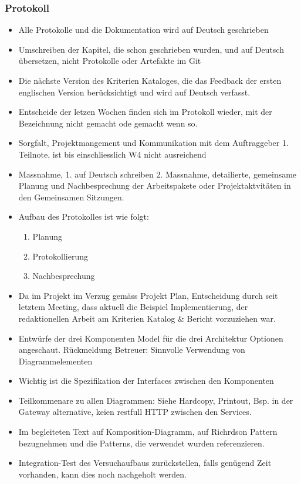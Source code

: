 \documentclass{article}
\begin{document}
\subsubsection{Protokoll}
\begin{itemize}
    \item Alle Protokolle und die Dokumentation wird auf Deutsch geschrieben
    \item Umschreiben der Kapitel, die schon geschrieben wurden, und auf Deutsch übersetzen, nicht Protokolle oder Artefakte im Git
    \item Die nächste Version des Kriterien Kataloges, die das Feedback der ersten englischen Version berücksichtigt und wird auf Deutsch verfasst.
    \item Entscheide der letzen Wochen finden sich im Protokoll wieder, mit der Bezeichnung nicht gemacht ode gemacht wenn so.
    \item Sorgfalt, Projektmangement und Kommunikation mit dem Auftraggeber 1. Teilnote, ist bis einschliesslich W4 nicht ausreichend
    \item Massnahme, 1. auf Deutsch schreiben 2. Massnahme, detailierte, gemeinsame Planung und Nachbesprechung der Arbeitspakete oder Projektaktvitäten in den Gemeinsamen Sitzungen.
    \item Aufbau des Protokolles ist wie folgt:
        \begin{enumerate}
            \item Planung
            \item Protokollierung
            \item Nachbesprechung
        \end{enumerate} 
    \item Da im Projekt im Verzug gemäss Projekt Plan, Entscheidung durch seit letztem Meeting, dass aktuell die Beispiel Implementierung, der redaktionellen Arbeit am Kriterien Katalog \& Bericht vorzuziehen war.
    \item Entwürfe der drei Komponenten Model für die drei Architektur Optionen angeschaut. Rückmeldung Betreuer: Sinnvolle Verwendung von Diagrammelementen
    \item Wichtig ist die Spezifikation der Interfaces zwischen den Komponenten
    \item Teilkommenare zu allen Diagrammen: Siehe Hardcopy, Printout, Bsp. in der Gateway alternative, keien restfull HTTP zwischen den Services.
    \item Im begleiteten Text auf Komposition-Diagramm, auf Richrdson Pattern bezugnehmen und die Patterns, die verwendet wurden referenzieren.
    \item Integration-Test des Versuchaufbaus zurückstellen, falls genügend Zeit vorhanden, kann dies noch nachgeholt werden.
\end{itemize}
\end{document}
